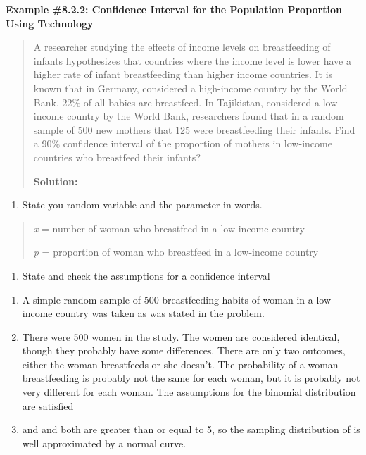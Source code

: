 \documentclass[]{book}
\providecommand{\tightlist}{%
  \setlength{\itemsep}{0pt}\setlength{\parskip}{0pt}}
\begin{document}
\textbf{Example \#8.2.2: Confidence Interval for the Population Proportion
Using Technology}

\begin{quote}
A researcher studying the effects of income levels on breastfeeding of
infants hypothesizes that countries where the income level is lower
have a higher rate of infant breastfeeding than higher income
countries. It is known that in Germany, considered a high-income
country by the World Bank, 22\% of all babies are breastfeed. In
Tajikistan, considered a low-income country by the World Bank,
researchers found that in a random sample of 500 new mothers that 125
were breastfeeding their infants. Find a 90\% confidence interval of
the proportion of mothers in low-income countries who breastfeed their
infants?

\textbf{Solution:}
\end{quote}

\begin{enumerate}
\def\labelenumi{\arabic{enumi}.}
\tightlist
\item
  State you random variable and the parameter in words.
\end{enumerate}

\begin{quote}
\emph{x} = number of woman who breastfeed in a low-income country

\emph{p} = proportion of woman who breastfeed in a low-income country
\end{quote}

\begin{enumerate}
\def\labelenumi{\arabic{enumi}.}
\setcounter{enumi}{1}
\tightlist
\item
  State and check the assumptions for a confidence interval
\end{enumerate}

\begin{enumerate}
\def\labelenumi{\alph{enumi}.}
\item
  A simple random sample of 500 breastfeeding habits of woman in a low-income country was taken as was stated in the problem.
\item
  There were 500 women in the study. The women are considered identical, though they probably have some differences. There are only two outcomes, either the woman breastfeeds or she doesn't. The probability of a woman breastfeeding is probably not the same for each woman, but it is probably not very different for each woman. The assumptions for the binomial distribution are satisfied
\item
  and and both are greater than or equal to 5, so the sampling distribution of is well approximated by a normal curve.
\end{enumerate}
\end{document}

